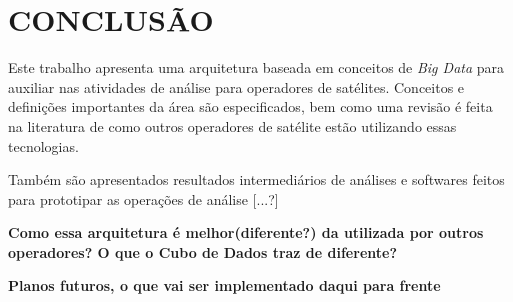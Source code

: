 
\chapter{CONCLUSÃO}

Este trabalho apresenta uma arquitetura baseada em conceitos de \textit{Big Data} para auxiliar nas atividades de análise para operadores de satélites. Conceitos e definições importantes da área são especificados, bem como uma revisão é feita na literatura de como outros operadores de satélite estão utilizando essas tecnologias.

Também são apresentados resultados intermediários de análises e softwares feitos para prototipar as operações de análise [...?]

\textbf{Como essa arquitetura é melhor(diferente?) da utilizada por outros operadores? O que o Cubo de Dados traz de diferente?}

\textbf{Planos futuros, o que vai ser implementado daqui para frente}

